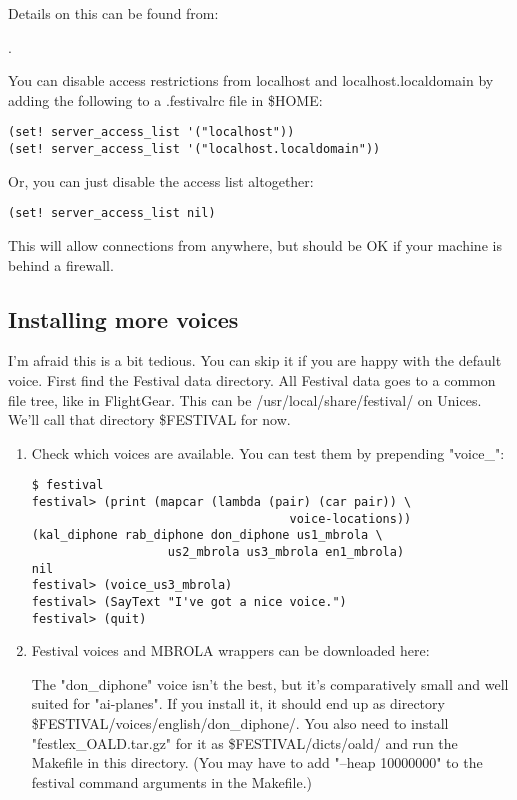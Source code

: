 \begin{enumerate}
Details on this can be found from:

.

You can disable access restrictions from localhost and localhost.localdomain by adding
the following to a .festivalrc file in \$HOME:
\begin{verbatim}
(set! server_access_list '("localhost"))
(set! server_access_list '("localhost.localdomain"))
\end{verbatim}

Or, you can just disable the access list altogether:

\begin{verbatim}
(set! server_access_list nil)
\end{verbatim}

This will allow connections from anywhere, but should be OK if your machine is behind a
firewall.

\subsection{Installing more voices}

I'm afraid this is a bit tedious. You can skip it if you are happy with the default voice.
First find the Festival data directory. All Festival data goes to a common file tree,
like in FlightGear. This can be /usr/local/share/festival/ on Unices. We'll call that
directory \$FESTIVAL for now.

\begin{enumerate}
\item Check which voices are available. You can test them by prepending "voice\_":

\begin{verbatim}
$ festival
festival> (print (mapcar (lambda (pair) (car pair)) \
                                    voice-locations))
(kal_diphone rab_diphone don_diphone us1_mbrola \
                   us2_mbrola us3_mbrola en1_mbrola)
nil
festival> (voice_us3_mbrola)
festival> (SayText "I've got a nice voice.")
festival> (quit)
\end{verbatim}

\item Festival voices and MBROLA wrappers can be downloaded here:

\web{http://festvox.org/packed/festival/1.95/}

The "don\_diphone" voice isn't the best,
but it's comparatively small and well suited for "ai-planes". If you install it,
it should end up as directory \$FESTIVAL/voices/english/don\_diphone/.
You also need to install "festlex\_OALD.tar.gz" for it as \$FESTIVAL/dicts/oald/ and
run the Makefile in this directory. (You may have to add "--heap 10000000" to the
festival command arguments in the Makefile.)


\end{enumerate}
\end{enumerate}
